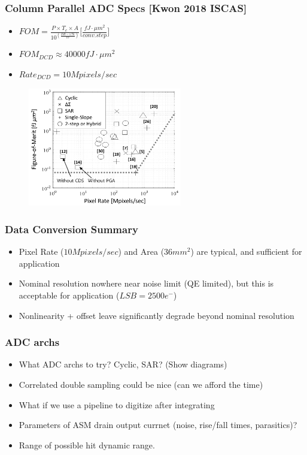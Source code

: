 \documentclass{beamer}
\begin{document}
\begin{frame}
    \frametitle{Column Parallel ADC Specs [Kwon 2018 ISCAS]}
    \begin{itemize}
        \item $FOM=\frac{P\times T_c \times A}{10^(\frac{DR-1.76}{10})}\bigr[\frac{fJ \cdot \mu m^2 }{conv.step}\bigl]$
        \item $FOM_{DCD}\approx40000fJ \cdot \mu m^2$
        \item $Rate_{DCD}=10Mpixels/sec$
    \end{itemize}
    \begin{figure}
        \includegraphics[width=0.6\textwidth]{fom.png}
    \end{figure}
\end{frame}

\begin{frame}
    \frametitle{Data Conversion Summary}
    \begin{itemize}
    \item Pixel Rate ($10Mpixels/sec$) and Area ($36 mm^2$) are typical, and sufficient for application
    \item Nominal resolution nowhere near noise limit (QE limited), but this is acceptable for application ($LSB=2500e^-$)
    \item Nonlinearity + offset leave significantly degrade beyond nominal resolution
    \end{itemize}
\end{frame}

\begin{frame}
    \frametitle{ADC archs}
    \begin{itemize}
    \item What ADC archs to try? Cyclic, SAR? (Show diagrams)
    \item Correlated double sampling could be nice (can we afford the time)
    \item What if we use a pipeline to digitize after integrating
    \item Parameters of ASM drain output currnet (noise, rise/fall times, parasitics)?
    \item Range of possible hit dynamic range.
    \end{itemize}
\end{frame}
\end{document}
